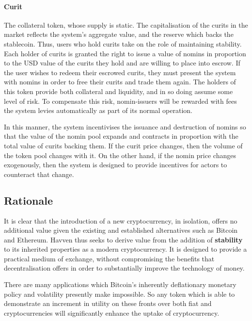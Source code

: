\paragraph{Curit} The collateral token, whose supply is static.
The capitalisation of the curits in the market reflects the system's aggregate value, and the reserve
which backs the stablecoin. Thus, users who hold curits take on the role of maintaining stability. \\

\noindent Each holder of curits is granted the right to issue a value of nomins in proportion to the USD value
of the curits they hold and are willing to place into escrow. If the user wishes to redeem their escrowed curits, they must
present the system with nomins in order to free their curits and trade them again.
The holders of this token provide both collateral and liquidity, and in so doing assume some
level of risk. To compensate this risk, nomin-issuers will be rewarded with fees the system levies
automatically as part of its normal operation.

In this manner, the system incentivises the issuance and destruction of nomins so that the value of
the nomin pool expands and contracts in proportion with the total value of curits backing them.
If the curit price changes, then the volume of the token pool changes with it.
On the other hand, if the nomin price changes exogenously, then the system is designed to provide
incentives for actors to counteract that change. \\

\subsection{Rationale}

It is clear that the introduction of a new cryptocurrency, in isolation, offers no additional value given
the existing and established alternatives such as Bitcoin and Ethereum. Havven thus seeks to derive value
from the addition of \textbf{stability} to its inherited properties as a modern cryptocurrency.
It is designed to provide a practical medium of exchange, without compromising the benefits that decentralisation
offers in order to substantially improve the technology of money.

There are many applications which Bitcoin's inherently deflationary monetary policy and
volatility presently make impossible. So any token which is able to demonstrate an increment
in utility on these fronts over both fiat and cryptocurrencies will significantly
enhance the uptake of cryptocurrency.

